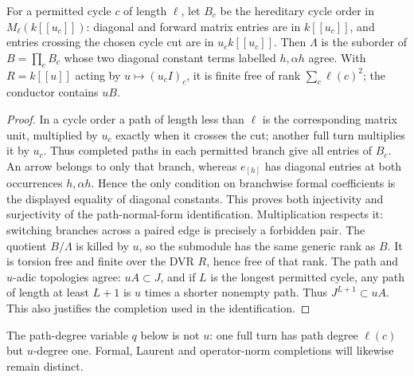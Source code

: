 \begin{proposition}\label{thm:order}
For a permitted cycle $c$ of length $\ell$, let $B_c$ be the hereditary cycle order in $M_\ell(k[[u_c]])$: diagonal and forward matrix entries are in $k[[u_c]]$, and entries crossing the chosen cycle cut are in $u_c k[[u_c]]$. Then $\Lambda$ is the suborder of $B=\prod_c B_c$ whose two diagonal constant terms labelled $h,\alpha h$ agree. With $R=k[[u]]$ acting by $u\mapsto(u_c I)_c$, it is finite free of rank $\sum_c\ell(c)^2$; the conductor contains $uB$.
\end{proposition}
\begin{proof}
In a cycle order a path of length less than $\ell$ is the corresponding matrix unit, multiplied by $u_c$ exactly when it crosses the cut; another full turn multiplies it by $u_c$. Thus completed paths in each permitted branch give all entries of $B_c$. An arrow belongs to only that branch, whereas $e_{[h]}$ has diagonal entries at both occurrences $h,\alpha h$. Hence the only condition on branchwise formal coefficients is the displayed equality of diagonal constants. This proves both injectivity and surjectivity of the path-normal-form identification. Multiplication respects it: switching branches across a paired edge is precisely a forbidden pair. The quotient $B/\Lambda$ is killed by $u$, so the submodule has the same generic rank as $B$. It is torsion free and finite over the DVR $R$, hence free of that rank. The path and $u$-adic topologies agree: $uA\subset J$, and if $L$ is the longest permitted cycle, any path of length at least $L+1$ is $u$ times a shorter nonempty path. Thus $J^{L+1}\subset uA$. This also justifies the completion used in the identification.
\end{proof}
The path-degree variable $q$ below is not $u$: one full turn has path degree $\ell(c)$ but $u$-degree one. Formal, Laurent and operator-norm completions will likewise remain distinct.

